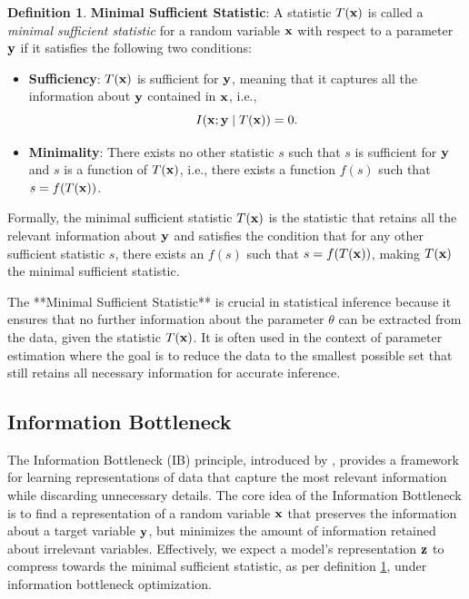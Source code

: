\documentclass[11pt, oneside]{book}
\theoremstyle{plain}
\theoremstyle{definition}
\newtheorem{definition}[theorem]{Definition}
\theoremstyle{remark}
\begin{document}
\begin{definition}
\textbf{Minimal Sufficient Statistic}: A statistic \( T({\mathbf{x}}) \) is called a \textit{minimal sufficient statistic} for a random variable \( {\mathbf{x}} \) with respect to a parameter \( {\mathbf{y}} \) if it satisfies the following two conditions:
\begin{itemize}
    \item \textbf{Sufficiency}: \( T({\mathbf{x}}) \) is sufficient for \( {\mathbf{y}} \), meaning that it captures all the information about \( {\mathbf{y}} \) contained in \( {\mathbf{x}} \), i.e., 
    \[
    I({\mathbf{x}}; {\mathbf{y}} \mid T({\mathbf{x}})) = 0.
    \]
    \item \textbf{Minimality}: There exists no other statistic \( s \) such that \( s \) is sufficient for \( {\mathbf{y}} \) and \( s \) is a function of \( T({\mathbf{x}}) \), i.e., there exists a function \( f(s) \) such that \( s = f(T({\mathbf{x}})) \).
\end{itemize}
Formally, the minimal sufficient statistic \( T({\mathbf{x}}) \) is the statistic that retains all the relevant information about \( {\mathbf{y}} \) and satisfies the condition that for any other sufficient statistic \( s \), there exists an \( f(s) \) such that \( s = f(T({\mathbf{x}})) \), making \( T({\mathbf{x}}) \) the minimal sufficient statistic.
\label{def:mss}
\end{definition}

The **Minimal Sufficient Statistic** is crucial in statistical inference because it ensures that no further information about the parameter $\theta$ can be extracted from the data, given the statistic $T({\mathbf{x}})$. It is often used in the context of parameter estimation where the goal is to reduce the data to the smallest possible set that still retains all necessary information for accurate inference.

\subsection{Information Bottleneck}

The Information Bottleneck (IB) principle, introduced by \cite{tishby2000information}, provides a framework for learning representations of data that capture the most relevant information while discarding unnecessary details. The core idea of the Information Bottleneck is to find a representation of a random variable ${\mathbf{x}}$ that preserves the information about a target variable ${\mathbf{y}}$, but minimizes the amount of information retained about irrelevant variables. Effectively, we expect a model's representation ${\mathbf{z}}$ to compress towards the minimal sufficient statistic, as per definition \ref{def:mss}, under information bottleneck optimization.
\end{document}
